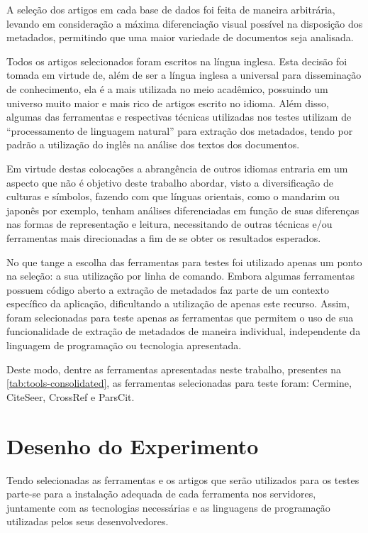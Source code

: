 A seleção dos artigos em cada base de dados foi feita de maneira arbitrária, levando em consideração a máxima diferenciação visual possível na disposição dos metadados, permitindo que uma maior variedade de documentos seja analisada.


Todos os artigos selecionados foram escritos na língua inglesa. Esta decisão foi tomada em virtude de, além de ser a língua inglesa a universal para disseminação de conhecimento, ela é a mais utilizada no meio acadêmico, possuindo um universo muito maior e mais rico de artigos escrito no idioma. Além disso, algumas das ferramentas e respectivas técnicas utilizadas nos testes utilizam de ``processamento de linguagem natural'' para extração dos metadados, tendo por padrão a utilização do inglês na análise dos textos dos documentos.

Em virtude destas colocações a abrangência de outros idiomas entraria em um aspecto que não é objetivo deste trabalho abordar, visto a diversificação de culturas e símbolos, fazendo com que línguas orientais, como o mandarim ou japonês por exemplo, tenham análises diferenciadas em função de suas diferenças nas formas de representação e leitura, necessitando de outras técnicas e/ou ferramentas mais direcionadas a fim de se obter os resultados esperados.

No que tange a escolha das ferramentas para testes foi utilizado apenas um ponto na seleção: a sua utilização por linha de comando. Embora algumas ferramentas possuem código aberto a extração de metadados faz parte de um contexto específico da aplicação, dificultando a utilização de apenas este recurso. Assim, foram selecionadas para teste apenas as ferramentas que permitem o uso de sua funcionalidade de extração de metadados de maneira individual, independente da linguagem de programação ou tecnologia apresentada. 

Deste modo, dentre as ferramentas apresentadas neste trabalho, presentes na \autoref{tab:tools-consolidated}, as ferramentas selecionadas para teste foram: Cermine, CiteSeer, CrossRef e ParsCit.
    

\section{Desenho do Experimento}
\label{sec:experiment-design}

Tendo selecionadas as ferramentas e os artigos que serão utilizados para os testes parte-se para a instalação adequada de cada ferramenta nos servidores, juntamente com as tecnologias necessárias e as linguagens de programação utilizadas pelos seus desenvolvedores. 

